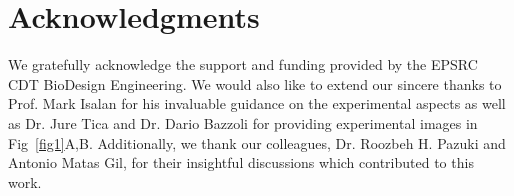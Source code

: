 \documentclass[10pt,letterpaper]{article}
\begin{document}
\section*{Acknowledgments}
We gratefully acknowledge the support and funding provided by the EPSRC CDT BioDesign Engineering. We would also like to extend our sincere thanks to Prof. Mark Isalan for his invaluable guidance on the experimental aspects as well as Dr. Jure Tica and Dr. Dario Bazzoli for providing experimental images in Fig~\ref{fig1}A,B. Additionally, we thank our colleagues, Dr. Roozbeh H. Pazuki
 and Antonio Matas Gil, for their insightful discussions which contributed to this work.


%
%


%
%
%



%
\end{document}
